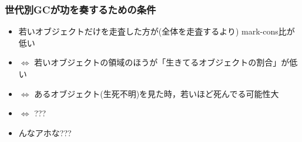 \documentclass[11pt,dvipdfmx]{beamer}
\newif\ifja
\newif\ifeng
\newcommand{\ao}[1]{{\color{blue}#1}}
\begin{document}
\ifja
\begin{frame}
\frametitle{課題1: 世代別GCが狙う領域}
\begin{beamercolorbox}{ex}
\vskip0.5cm
\begin{center}
若い(最近作られた)オブジェクトがいる領域
\end{center}
\vskip0.2cm
\end{beamercolorbox}

\begin{center}
\only<2->{Q: なぜ(または，いつ)これが功を奏するのか?}
\end{center}
\end{frame}
\fi
\ifeng
\begin{frame}
\frametitle{Problem 1: where generational GC targets}
\begin{beamercolorbox}{ex}
\vskip0.5cm
\begin{center}
a region holding young (recently created) objects
\end{center}
\vskip0.2cm
\end{beamercolorbox}

\begin{center}
\only<2->{Q: why (or when) is this effective?}
\end{center}
\end{frame}
\fi

\iffalse
\begin{frame}
\frametitle{世代別GCが功を奏するための条件}

\begin{itemize}
\item<1-> 若いオブジェクトだけを走査した方が(全体を走査するより) mark-cons比が低い
\item<2-> $\iff$ 若いオブジェクトの領域のほうが「生きてるオブジェクトの割合」が低い
\item<3-> $\iff$ あるオブジェクト(生死不明)を見た時，\ao{若いほど死んでる可能性大}
\item<4-> $\iff$ ???
\begin{center}
%
%
\end{center}
\item<6-> んなアホな???
\end{itemize}
\end{frame}
\end{document}
